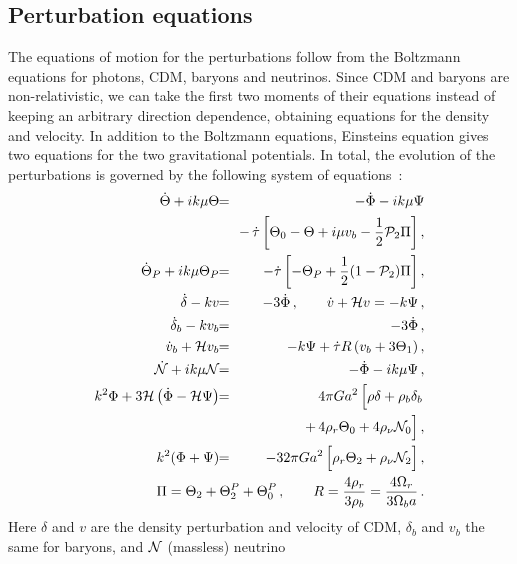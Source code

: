 \documentclass[twocolumn,nofootinbib,amsmath,amssymb]{revtex4}
\newcommand{\ba}{\begin{eqnarray}}
\newcommand{\ea}{\end{eqnarray}}
\newcommand{\hs}{\hspace{-1.12mm}}
\newcommand{\eq}{\hs & = & \hs}
\newcommand{\eqnl}{\hs & & \hs}
\newcommand{\addspace}[2][3mm]{\raisebox{0mm}[#1][#1]{$\displaystyle #2$}}
\newcommand{\addsmsp}[1]{\addspace[2mm]{#1}}
\begin{document}
\subsection{Perturbation equations}

The equations of motion for the perturbations follow from the Boltzmann
equations for photons, CDM, baryons and neutrinos. Since CDM and baryons are
non-relativistic, we can take the first two moments of their equations instead
of keeping an arbitrary direction dependence, obtaining equations for the
density and velocity. In addition to the Boltzmann equations, Einsteins
equation gives two equations for the two gravitational potentials. In total,
the evolution of the perturbations is governed by the following system of
equations~\cite{Dodelson}:
\ba
  \dot{\Theta} + ik\mu\Theta \eq -\dot{\Phi} - ik\mu\Psi \nonumber \\
  \eqnl - \, \dot{\tau} \left[
    \Theta_0 - \Theta + i\mu v_b - \frac{1}{2} {\cal P}_2 \Pi
  \right] , \nonumber \\
  \dot{\Theta}_P + ik\mu\Theta_P \eq -\dot{\tau} \left[
    -\Theta_P + \frac{1}{2} (1 - {\cal P}_2) \Pi
  \right] , \nonumber \\
  \dot{\delta} - kv \eq -3\dot{\Phi} \, , \qquad
  \dot{v} + {\cal H} v = -k\Psi \, , \nonumber \\
  \dot{\delta}_b - kv_b \eq -3\dot{\Phi} \, , \nonumber \\
  \dot{v}_b + {\cal H} v_b \eq -k\Psi +
    \dot{\tau} R \left( v_b + 3\Theta_1 \right) , \nonumber \\
  \dot{\cal N} + ik\mu {\cal N} \eq -\dot{\Phi} - ik\mu\Psi \, , \nonumber \\
  k^2 \Phi + 3 {\cal H} \left( \dot{\Phi} - {\cal H} \Psi \right) \eq
    4\pi G a^2 \left[ \addsmsp{ \rho\delta + \rho_b \delta_b } \right.
    \nonumber \\
  && \hspace{10.6mm} \left. \addsmsp{
    + \, 4\rho_r \Theta_0 + 4\rho_\nu {\cal N}_0
    } \right] , \nonumber \\
  k^2 (\Phi+\Psi) \eq -32\pi G a^2
    \left[ \addsmsp{ \rho_r \Theta_2 + \rho_\nu {\cal N}_2 } \right] ,
    \nonumber \\
  && \hspace{-35mm} \Pi = \Theta_2 + \Theta^P_2 + \Theta^P_0 \, , \qquad
  R = \frac{4\rho_r}{3\rho_b} = \frac{4\Omega_r}{3\Omega_b a} \, .
  \label{eq:diffeqs_start}
\ea
Here $\delta$ and $v$ are the density perturbation and velocity of CDM,
$\delta_b$ and $v_b$ the same for baryons, and ${\cal N}$ (massless) neutrino
\end{document}
